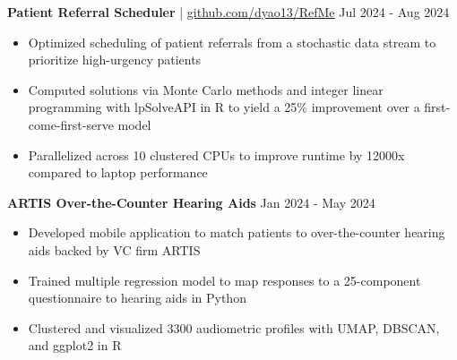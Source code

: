 \documentclass[11pt]{article}       %
\begin{document}
\textbf{Patient Referral Scheduler} | \href{https://github.com/dyao13/RefMe}{github.com/dyao13/RefMe} \hfill Jul 2024 - Aug 2024 \vspace{-9pt} \\
\begin{itemize}
  \item Optimized scheduling of patient referrals from a stochastic data stream to prioritize high-urgency patients 
  \item Computed solutions via Monte Carlo methods and integer linear programming with lpSolveAPI in R to yield a 25\% improvement over a first-come-first-serve model
  \item Parallelized across 10 clustered CPUs to improve runtime by 12000x compared to laptop performance
\end{itemize}

\textbf{ARTIS Over-the-Counter Hearing Aids} \hfill Jan 2024 - May 2024 \vspace{-9pt} \\
\begin{itemize}
  \item Developed mobile application to match patients to over-the-counter hearing aids backed by VC firm ARTIS
  \item Trained multiple regression model to map responses to a 25-component questionnaire to hearing aids in Python
  \item Clustered and visualized 3300 audiometric profiles with UMAP, DBSCAN, and ggplot2 in R
\end{itemize}

\vspace{-9pt}
\end{document}
